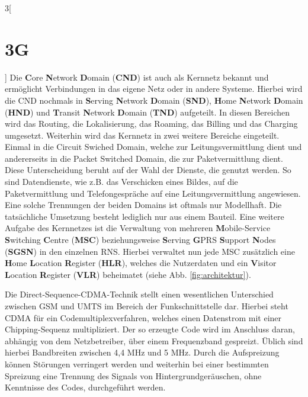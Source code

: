 \begin{multicols}{3}[\section{3G}]
Die \textbf{C}ore \textbf{N}etwork \textbf{D}omain (\textbf{CND}) ist auch als Kernnetz bekannt und ermöglicht Verbindungen in das eigene Netz oder in andere Systeme. Hierbei wird die CND nochmals in \textbf{S}erving \textbf{N}etwork \textbf{D}omain (\textbf{SND}), \textbf{H}ome \textbf{N}etwork \textbf{D}omain (\textbf{HND}) und \textbf{T}ransit \textbf{N}etwork \textbf{D}omain (\textbf{TND}) aufgeteilt. In diesen Bereichen wird das Routing, die Lokalisierung, das Roaming, das Billing und das Charging umgesetzt. Weiterhin wird das Kernnetz in zwei weitere Bereiche eingeteilt. Einmal in die Circuit Swiched Domain, welche zur Leitungsvermittlung dient und andererseits in die Packet Switched Domain, die zur Paketvermittlung dient. Diese Unterscheidung beruht auf der Wahl der Dienste, die genutzt werden. So sind Datendienste, wie z.B. das Verschicken eines Bildes, auf die Paketvermittlung und Telefongespräche auf eine Leitungsvermittlung angewiesen. Eine solche Trennungen der beiden Domains ist oftmals nur Modellhaft. Die tatsächliche Umsetzung besteht lediglich nur aus einem Bauteil. Eine weitere Aufgabe des Kernnetzes ist die Verwaltung von mehreren \textbf{M}obile-Service \textbf{S}witching \textbf{C}entre (\textbf{MSC}) beziehungsweise \textbf{S}erving \textbf{G}PRS \textbf{S}upport \textbf{N}odes (\textbf{SGSN}) in den einzelnen RNS. Hierbei verwaltet nun jede MSC zusätzlich eine \textbf{H}ome \textbf{L}ocation \textbf{R}egister (\textbf{HLR}), welches die Nutzerdaten und ein \textbf{V}isitor \textbf{L}ocation \textbf{R}egister (\textbf{VLR})  beheimatet (siehe Abb. \ref{fig:architektur}).

Die Direct-Sequence-CDMA-Technik stellt einen wesentlichen Unterschied zwischen GSM und UMTS im Bereich der Funkschnittstelle dar. Hierbei steht CDMA für ein Codemultiplexverfahren, welches einen Datenstrom mit einer Chipping-Sequenz multipliziert. Der so erzeugte Code wird im Anschluss daran, abhängig von dem Netzbetreiber, über einem Frequenzband gespreizt. Üblich sind hierbei Bandbreiten zwischen 4,4 MHz und 5 MHz. Durch die Aufspreizung können Störungen verringert werden und weiterhin bei einer bestimmten Spreizung eine Trennung des Signals von Hintergrundgeräuschen, ohne Kenntnisse des Codes, durchgeführt werden.~\cite{3G.1, 3G.4}


\end{multicols}
